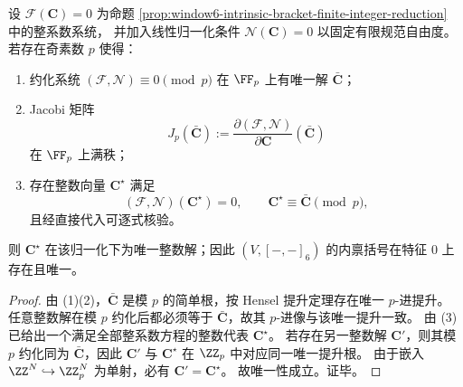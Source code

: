 \begin{theorem}\label{thm:window6-intrinsic-bracket-modp-lift-criterion}
设 \(\mathcal F(\mathbf C)=0\) 为命题
\ref{prop:window6-intrinsic-bracket-finite-integer-reduction}
中的整系数系统，
并加入线性归一化条件 \(\mathcal N(\mathbf C)=0\) 以固定有限规范自由度。
若存在奇素数 \(p\) 使得：
\begin{enumerate}
  \item 约化系统
  \(
  (\mathcal F,\mathcal N)\equiv 0\pmod p
  \)
  在 \(\FF_p\) 上有唯一解 \(\bar{\mathbf C}\)；
  \item Jacobi 矩阵
  \[
  J_p(\bar{\mathbf C})
  :=\frac{\partial(\mathcal F,\mathcal N)}{\partial\mathbf C}(\bar{\mathbf C})
  \]
  在 \(\FF_p\) 上满秩；
  \item 存在整数向量 \(\mathbf C^\star\) 满足
  \[
  (\mathcal F,\mathcal N)(\mathbf C^\star)=0,\qquad
  \mathbf C^\star\equiv \bar{\mathbf C}\pmod p,
  \]
  且经直接代入可逐式核验。
\end{enumerate}
则 \(\mathbf C^\star\) 在该归一化下为唯一整数解；因此
\((V,[-,-]_6)\) 的内禀括号在特征 \(0\) 上存在且唯一。
\end{theorem}
\begin{proof}
由 (1)(2)，\(\bar{\mathbf C}\) 是模 \(p\) 的简单根，按 Hensel 提升定理存在唯一 \(p\)-进提升。
任意整数解在模 \(p\) 约化后都必须等于 \(\bar{\mathbf C}\)，故其 \(p\)-进像与该唯一提升一致。
由 (3) 已给出一个满足全部整系数方程的整数代表 \(\mathbf C^\star\)。
若存在另一整数解 \(\mathbf C'\)，则其模 \(p\) 约化同为 \(\bar{\mathbf C}\)，因此 \(\mathbf C'\) 与 \(\mathbf C^\star\) 在 \(\ZZ_p\) 中对应同一唯一提升根。
由于嵌入 \(\ZZ^N\hookrightarrow \ZZ_p^N\) 为单射，必有 \(\mathbf C'=\mathbf C^\star\)。
故唯一性成立。证毕。
\end{proof}

